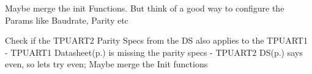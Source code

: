 \begin{DoxyRefList}
\item[\label{todo__todo000007}%
\hypertarget{todo__todo000007}{}%
Global \hyperlink{_u_a_r_t_8h_a267c0b0bf7f4f8b70049d91449590cf8}{usart\+\_\+init\+\_\+pc} (void)]Maybe merge the init Functions. But think of a good way to configure the Params like Baudrate, Parity etc  
\item[\label{todo__todo000006}%
\hypertarget{todo__todo000006}{}%
Global \hyperlink{_u_a_r_t_8h_a09e438e4f709b00836cebb0d6a44f223}{usart\+\_\+init\+\_\+tpuart} (void)]Check if the T\+P\+U\+A\+R\+T2 Parity Specs from the DS also applies to the T\+P\+U\+A\+R\+T1 -\/ T\+P\+U\+A\+R\+T1 Datasheet(p.) is missing the parity specs -\/ T\+P\+U\+A\+R\+T2 DS(p.) says even, so lets try even; Maybe merge the Init functions 
\end{DoxyRefList}